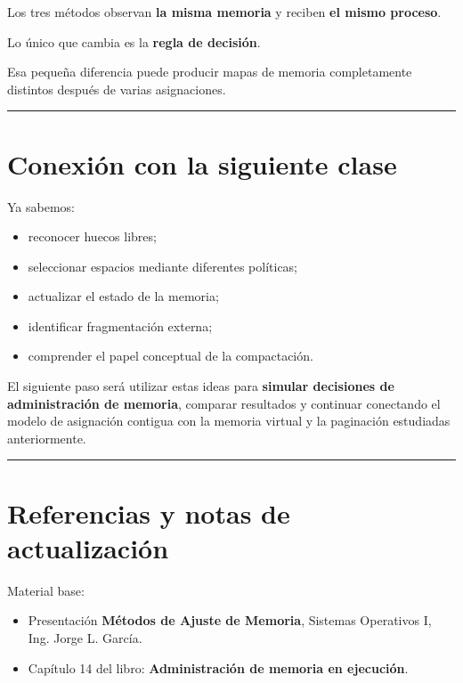 \documentclass[
  spanish,
  letterpaper,
]{scrbook}
\providecommand{\tightlist}{%
  \setlength{\itemsep}{0pt}\setlength{\parskip}{0pt}}
\begin{document}
Los tres métodos observan \textbf{la misma memoria} y reciben \textbf{el
mismo proceso}.

Lo único que cambia es la \textbf{regla de decisión}.

Esa pequeña diferencia puede producir mapas de memoria completamente
distintos después de varias asignaciones.

\begin{center}\rule{0.5\linewidth}{0.5pt}\end{center}


\chapter{Conexión con la siguiente
clase}\label{conexiuxf3n-con-la-siguiente-clase-5}

Ya sabemos:

\begin{itemize}
\tightlist
\item
  reconocer huecos libres;
\item
  seleccionar espacios mediante diferentes políticas;
\item
  actualizar el estado de la memoria;
\item
  identificar fragmentación externa;
\item
  comprender el papel conceptual de la compactación.
\end{itemize}

El siguiente paso será utilizar estas ideas para \textbf{simular
decisiones de administración de memoria}, comparar resultados y
continuar conectando el modelo de asignación contigua con la memoria
virtual y la paginación estudiadas anteriormente.

\begin{center}\rule{0.5\linewidth}{0.5pt}\end{center}


\chapter{Referencias y notas de
actualización}\label{referencias-y-notas-de-actualizaciuxf3n-1}

Material base:

\begin{itemize}
\tightlist
\item
  Presentación \textbf{Métodos de Ajuste de Memoria}, Sistemas
  Operativos I, Ing. Jorge L. García.
\item
  Capítulo 14 del libro: \textbf{Administración de memoria en
  ejecución}.
\end{itemize}
\end{document}
